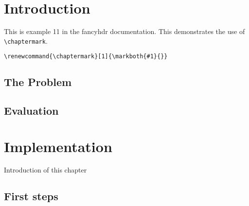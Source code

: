 \documentclass{book}
\renewcommand{\chaptermark}[1]{\markboth{#1}{}}
\begin{document}
\chapter{Introduction}

\begin{boxedminipage}{\textwidth}
This is example 11 in the fancyhdr documentation. 
This demonstrates the use of \verb|\chaptermark|.
\begin{verbatim}
\renewcommand{\chaptermark}[1]{\markboth{#1}{}}
\end{verbatim}
\end{boxedminipage}

\section{The Problem}
\label{sec:problem}

\lipsum[1]

\section{Evaluation}

\lipsum[2]

\chapter{Implementation}

Introduction of this chapter

\lipsum[3]

\section{First steps}
\label{sec:first-steps}

\lipsum
\end{document}
